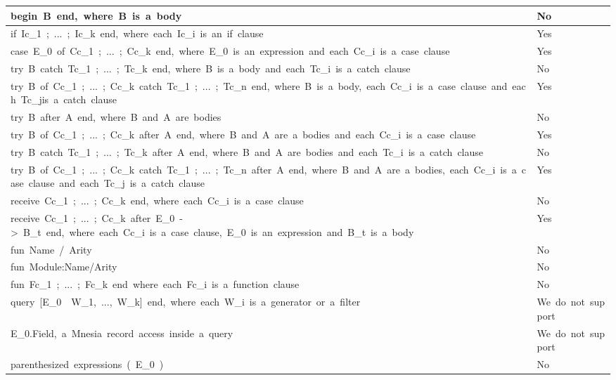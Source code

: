 \documentclass[12pt,a4paper]{report}
\begin{document}
\begin{flushleft}
\begin{supertabular}{|m{13.188cm}|m{2.922cm}|}
\color{black} begin\ B\ end,\ where\ B\ is\ a\ body &
\color{black} No\\\hline
\color{black}
if\ Ic\_1\ ;\ ...\ ;\ Ic\_k\ end,\ where\ each\ Ic\_i\ is\ an\ if\ clause\ 
&
\color{black} Yes\\\hline
\color{black}
case\ E\_0\ of\ Cc\_1\ ;\ ...\ ;\ Cc\_k\ end,\ where\ E\_0\ is\ an\ expression\ and\ each\ Cc\_i\ is\ a\ case\ clause\ 
&
\color{black} Yes\\\hline
\color{black}
try\ B\ catch\ Tc\_1\ ;\ ...\ ;\ Tc\_k\ end,\ where\ B\ is\ a\ body\ and\ each\ Tc\_i\ is\ a\ catch\ clause
&
\color{black} No\\\hline
\color{black}
try\ B\ of\ Cc\_1\ ;\ ...\ ;\ Cc\_k\ catch\ Tc\_1\ ;\ ...\ ;\ Tc\_n\ end,\ where\ B\ is\ a\ body,\ each\ Cc\_i\ is\ a\ case\ clause\ and\ each\ Tc\_jis\ a\ catch\ clause
&
\color{black} Yes\\\hline
\color{black} try\ B\ after\ A\ end,\ where\ B\ and\ A\ are\ bodies\  &
\color{black} No\\\hline
\color{black}
try\ B\ of\ Cc\_1\ ;\ ...\ ;\ Cc\_k\ after\ A\ end,\ where\ B\ and\ A\ are\ a\ bodies\ and\ each\ Cc\_i\ is\ a\ case\ clause
&
\color{black} Yes\\\hline
\color{black}
try\ B\ catch\ Tc\_1\ ;\ ...\ ;\ Tc\_k\ after\ A\ end,\ where\ B\ and\ A\ are\ bodies\ and\ each\ Tc\_i\ is\ a\ catch\ clause\ 
&
\color{black} No\\\hline
\color{black}
try\ B\ of\ Cc\_1\ ;\ ...\ ;\ Cc\_k\ catch\ Tc\_1\ ;\ ...\ ;\ Tc\_n\ after\ A\ end,\ where\ B\ and\ A\ are\ a\ bodies,\ each\ Cc\_i\ is\ a\ case\ clause\ and\ each\ Tc\_j\ is\ a\ catch\ clause
&
\color{black} Yes\\\hline
\color{black}
receive\ Cc\_1\ ;\ ...\ ;\ Cc\_k\ end,\ where\ each\ Cc\_i\ is\ a\ case\ clause
&
\color{black} No\\\hline
\color{black}
receive\ Cc\_1\ ;\ ...\ ;\ Cc\_k\ after\ E\_0\ {}-{\textgreater}\ B\_t\ end,\ where\ each\ Cc\_i\ is\ a\ case\ clause,\ E\_0\ is\ an\ expression\ and\ B\_t\ is\ a\ body
&
\color{black} Yes\\\hline
\color{black} fun\ Name\ /\ Arity &
\color{black} No\\\hline
\color{black} fun\ Module:Name/Arity &
\color{black} No\\\hline
\color{black}
fun\ Fc\_1\ ;\ ...\ ;\ Fc\_k\ end\ where\ each\ Fc\_i\ is\ a\ function\ clause
&
\color{black} No\\\hline
\color{black}
query\ [E\_0\ {\textbar}{\textbar}\ W\_1,\ ...,\ W\_k]\ end,\ where\ each\ W\_i\ is\ a\ generator\ or\ a\ filter
&
\color{black} We\ do\ not\ support\\\hline
\color{black} E\_0.Field,\ a\ Mnesia\ record\ access\ inside\ a\ query &
\color{black} We\ do\ not\ support\ \\\hline
\color{black} parenthesized\ expressions\ (\ E\_0\ ) &
\color{black} No\\\hline
\end{supertabular}
\end{flushleft}
\end{document}
